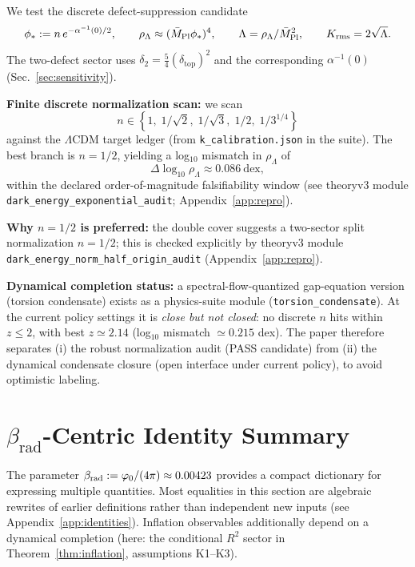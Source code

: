 \begin{tcolorbox}[colback=gray!5, colframe=gray!60,
title={\textbf{Closure-level candidate: discrete $\rho_\Lambda$ with no continuous knobs}}, fonttitle=\bfseries\small]
We test the discrete defect-suppression candidate
\[
\phi_\ast := n\,e^{-\alpha^{-1}(0)/2},
\qquad
\rho_\Lambda \approx (\bar{M}_{\mathrm{Pl}} \phi_\ast)^4,
\qquad
\Lambda=\rho_\Lambda/\bar{M}_{\mathrm{Pl}}^2,
\qquad
K_{\mathrm{rms}}=2\sqrt{\Lambda}.
\]
The two-defect sector uses $\delta_2=\tfrac54(\delta_{\mathrm{top}})^2$ and the corresponding $\alpha^{-1}(0)$ (Sec.~\ref{sec:sensitivity}).

\textbf{Finite discrete normalization scan:} we scan
\[
n\in\left\{1,\;1/\sqrt{2},\;1/\sqrt{3},\;1/2,\;1/3^{1/4}\right\}
\]
against the $\Lambda$CDM target ledger (from \texttt{k\_calibration.json} in the suite).
The best branch is $n=1/2$, yielding a log$_{10}$ mismatch in $\rho_\Lambda$ of
\[
\Delta\log_{10}\rho_\Lambda \approx 0.086~\text{dex},
\]
within the declared order-of-magnitude falsifiability window (see theoryv3 module \texttt{dark\_energy\_exponential\_audit}; Appendix~\ref{app:repro}).

\textbf{Why $n=1/2$ is preferred:} the double cover suggests a two-sector split normalization $n=1/2$; this is checked explicitly by theoryv3 module \texttt{dark\_energy\_norm\_half\_origin\_audit} (Appendix~\ref{app:repro}).

\textbf{Dynamical completion status:} a spectral-flow-quantized gap-equation version (torsion condensate) exists as a physics-suite module (\texttt{torsion\_condensate}). At the current policy settings it is \emph{close but not closed}: no discrete $n$ hits within $z\le 2$, with best $z\simeq 2.14$ (log$_{10}$ mismatch $\simeq 0.215$ dex). The paper therefore separates (i) the robust normalization audit (PASS candidate) from (ii) the dynamical condensate closure (open interface under current policy), to avoid optimistic labeling.
\end{tcolorbox}

\section{\texorpdfstring{$\beta_{\text{rad}}$-Centric Identity Summary}{beta_rad-Centric Identity Summary}}

The parameter $\beta_{\text{rad}} := \varphi_0/(4\pi) \approx 0.00423$ provides a compact dictionary for expressing multiple quantities. 
Most equalities in this section are algebraic rewrites of earlier definitions rather than independent new inputs (see Appendix~\ref{app:identities}). 
Inflation observables additionally depend on a dynamical completion (here: the conditional $R^2$ sector in Theorem~\ref{thm:inflation}, assumptions K1--K3).


